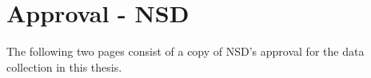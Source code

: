 \chapter{Approval - NSD}\label{app:nsdApproval}
The following two pages consist of a copy of NSD's approval for the data collection in this thesis.

